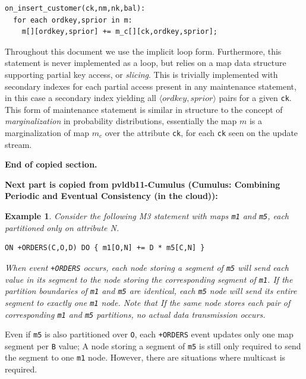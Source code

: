 \documentclass{sig-semester}
\newtheorem{example}[theorem]{Example}
\newcommand{\tuple}[1]{{\langle#1\rangle}}
\begin{document}
\begin{verbatim}
on_insert_customer(ck,nm,nk,bal):
  for each ordkey,sprior in m:
    m[][ordkey,sprior] += m_c[][ck,ordkey,sprior];
\end{verbatim}

\noindent Throughout this document we use the implicit loop form.
Furthermore, this statement is never implemented as a loop, but relies on a map
data structure supporting partial key access, or \textit{slicing}. This is
trivially implemented with secondary indexes for each partial access present in
any maintenance statement, in this case a secondary index yielding all
$\tuple{ordkey,sprior}$ pairs for a given \texttt{ck}.
This form of maintenance statement is similar in structure to the concept of
\textit{marginalization} in probability distributions, essentially the map $m$
is a marginalization of map $m_c$ over the attribute \texttt{ck}, for each
\texttt{ck} seen on the update stream.

\textbf{End of copied section.}

\textbf{Next part is copied from pvldb11-Cumulus (Cumulus: Combining Periodic and Eventual Consistency (in the cloud)):}

\begin{example}
Consider the following M3 statement with maps \texttt{m1} and \texttt{m5}, each partitioned only on attribute N.
\begin{verbatim}
ON +ORDERS(C,O,D) DO { m1[O,N] += D * m5[C,N] }
\end{verbatim}
When event \texttt{+ORDERS} occurs, each node storing a segment of \texttt{m5} will send each value in its segment to the node storing the corresponding segment of \texttt{m1}. If the partition boundaries of \texttt{m1} and \texttt{m5} are identical, each \texttt{m5} node will send its entire segment to exactly one \texttt{m1} node. Note that If the same node stores each pair of corresponding \texttt{m1} and \texttt{m5} partitions, no actual data transmission occurs.  
\end{example}

Even if \texttt{m5} is also partitioned over \texttt{O}, each \texttt{+ORDERS} event updates only one map segment per \texttt{B} value; A node storing a segment of \texttt{m5} is still only required to send the segment to one \texttt{m1} node.  However, there are situations where multicast is required.  
\end{document}
